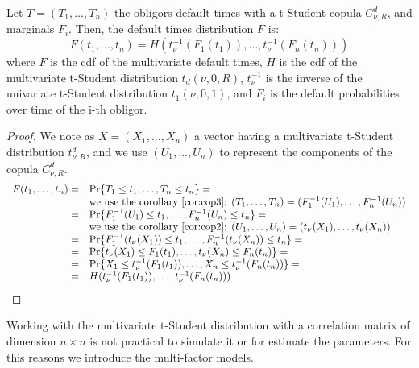 \documentclass[11pt,fleqn]{book} %
\begin{document}
\begin{proposition}
Let $T=(T_1,\dots,T_n)$ the obligors default times with a t-Student copula 
$C_{\nu,R}^d$, and marginals $F_i$. 
Then, the default times distribution $F$ is:
\begin{displaymath}
F(t_1,\dots,t_n) = H\left(t_\nu^{-1}(F_1(t_1)), \dots, t_\nu^{-1}(F_n(t_n))\right)
\end{displaymath}
where $F$ is the cdf of the multivariate default times, $H$ is the cdf of 
the multivariate t-Student distribution $t_d(\nu,0,R)$, $t_\nu^{-1}$ is the 
inverse of the univariate t-Student distribution $t_1(\nu,0,1)$, and $F_i$ 
is the default probabilities over time of the i-th obligor.
\end{proposition}
\begin{proof}
We note as $X=(X_1,\dots,X_n)$ a vector having a multivariate t-Student
distribution $t_{\nu,R}^d$, and we use $(U_1,\dots,U_n)$ to represent
the components of the copula $C_{\nu,R}^d$.
\begin{displaymath}
\begin{array}{rl}
F(t_1,\dots,t_n) = & \Pr\{ T_1 \le t_1 , \dots, T_n \le t_n \} = \\
  & \textrm{we use the corollary \ref{cor:cop3}: }
    (T_1,\dots,T_n) = (F_1^{-1}(U_1),\dots,F_n^{-1}(U_n)) \\
= & \Pr\{ F_1^{-1}(U_1) \le t_1 , \dots , F_n^{-1}(U_n) \le t_n \} = \\
  & \textrm{we use the corollary \ref{cor:cop2}: }
  (U_1,\dots,U_n) = (t_\nu(X_1),\dots,t_\nu(X_n)) \\
= & \Pr\{ F_1^{-1}(t_\nu(X_1)) \le t_1 , \dots , F_n^{-1}(t_\nu(X_n)) \le t_n \} = \\
= & \Pr\{ t_\nu(X_1) \le F_1(t_1) , \dots , t_\nu(X_n) \le F_n(t_n) \} = \\
= & \Pr\{ X_1 \le t_\nu^{-1}(F_1(t_1)) , \dots , X_n \le t_\nu^{-1}(F_n(t_n)) \} = \\
= & H(t_\nu^{-1}(F_1(t_1)), \dots, t_\nu^{-1}(F_n(t_n))) \\
\end{array}
\end{displaymath}
\end{proof}

Working with the multivariate t-Student distribution with a correlation
matrix of dimension $n \times n$ is not practical to simulate it or for
estimate the parameters. For this reasons we introduce the multi-factor 
models.
\end{document}
